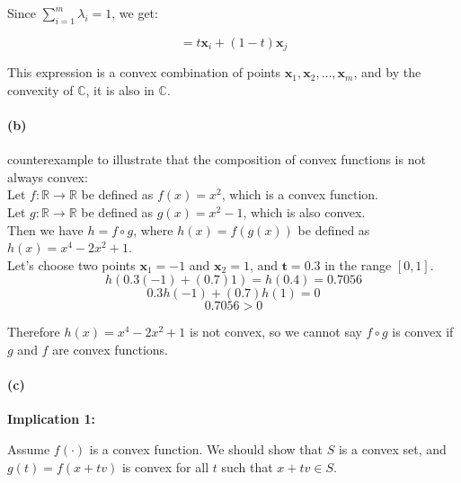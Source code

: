 \documentclass[12pt]{article}
\begin{document}
Since $\sum_{i=1}^{m} \lambda_i = 1$, we get:

\[
= t \mathbf{x}_i + (1-t) \mathbf{x}_j
\]

This expression is a convex combination of points $\mathbf{x}_1, \mathbf{x}_2, \ldots, \mathbf{x}_m$, and by the convexity of $\mathbb{C}$, it is also in $\mathbb{C}$.


\paragraph{(b)}
counterexample to illustrate that the composition of convex functions is not always convex: \\

Let \( f: \mathbb{R} \rightarrow \mathbb{R} \) be defined as \( f(x) = x^2 \), which is a convex function. \\

Let \( g: \mathbb{R} \rightarrow \mathbb{R} \) be defined as \( g(x) = x^2-1 \), which is also convex. \\

Then we have \( h = f \circ g \), where \( h(x) = f(g(x)) \) be defined as \( h(x) = x^4-2x^2+1 \). \\

Let's choose two points $\mathbf{x}_1 = -1$ and $\mathbf{x}_2 = 1$, and $\mathbf{t} = 0.3$ in the range $[0, 1]$. \\
\[
    h(0.3(-1) + (0.7)1) = h(0.4) = 0.7056
\]
\[
    0.3h(-1) + (0.7)h(1) = 0
\]
\[
    0.7056 > 0
\]


Therefore \( h(x) = x^4-2x^2+1 \) is not convex, so we cannot say \( f \circ g \) is convex if \( g \) and \( f \) are convex functions.
\paragraph{(c)}

\textbf{Implication 1:}

Assume \( f(·) \) is a convex function. We should show that \( S \) is a convex set, and \( g(t) = f(x + tv) \) is convex for all \( t \) such that \( x + tv \in S \).
\end{document}
